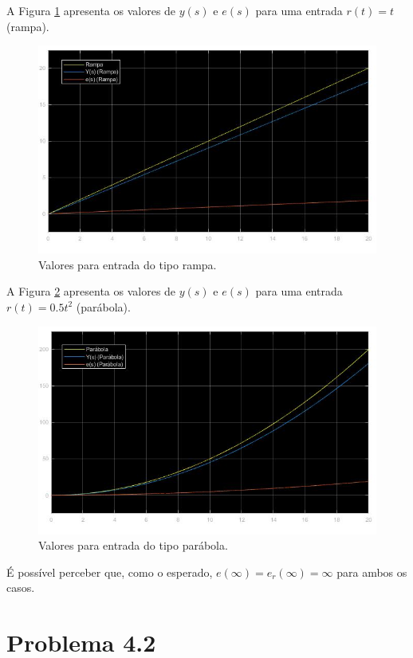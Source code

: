 \documentclass[
]{book}
\theoremstyle{definition}
\theoremstyle{definition}
\theoremstyle{definition}
\theoremstyle{remark}
\begin{document}
A Figura \ref{fig:fig41C1} apresenta os valores de \(y(s)\) e \(e(s)\) para uma entrada \(r(t) = t\) (rampa).

\begin{figure}
\includegraphics[width=0.8\linewidth]{Imagens/Lab4/Resolução/prob1C1} \caption{Valores para entrada do tipo rampa.}\label{fig:fig41C1}
\end{figure}

A Figura \ref{fig:fig41C2} apresenta os valores de \(y(s)\) e \(e(s)\) para uma entrada \(r(t) = 0.5t^2\) (parábola).

\begin{figure}
\includegraphics[width=0.8\linewidth]{Imagens/Lab4/Resolução/prob1C2} \caption{Valores para entrada do tipo parábola.}\label{fig:fig41C2}
\end{figure}

É possível perceber que, como o esperado, \(e(\infty)= e_r(\infty) = \infty\) para ambos os casos.

\hypertarget{problema-4.2}{%
\section*{Problema 4.2}\label{problema-4.2}}
\end{document}
